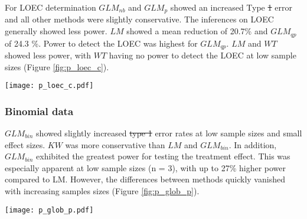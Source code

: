 \documentclass[twocolumn, natbib]{svjour3}
\providecommand{\DIFadd}[1]{{\protect\color{blue}\uwave{#1}}} %
\providecommand{\DIFdel}[1]{{\protect\color{red}\sout{#1}}}                      %
\providecommand{\DIFaddbegin}{} %
\providecommand{\DIFaddend}{} %
\providecommand{\DIFdelbegin}{} %
\providecommand{\DIFdelend}{} %
\providecommand{\DIFaddFL}[1]{\DIFadd{#1}} %
\providecommand{\DIFdelFL}[1]{\DIFdel{#1}} %
\providecommand{\DIFaddbeginFL}{} %
\providecommand{\DIFaddendFL}{} %
\providecommand{\DIFdelbeginFL}{} %
\providecommand{\DIFdelendFL}{} %
\begin{document}
For LOEC determination $GLM_{nb}$ and $GLM_{p}$ showed an increased Type \DIFdelbegin \DIFdel{1 }\DIFdelend \DIFaddbegin \DIFadd{I }\DIFaddend error and all other methods were slightly conservative.
The inferences on LOEC generally showed less power.
$LM$ showed a mean reduction of 20.7\% and $GLM_{qp}$ of 24.3 \%.
Power to detect the LOEC was highest for $GLM_{qp}$. 
$LM$ and $WT$ showed less power, with $WT$ having no power to detect the LOEC at low sample sizes (Figure \ref{fig:p_loec_c}).

\begin{figure*}
  \centering
  \texttt{[image: p\_loec\_c.pdf]}
  \caption{Count data simulations: Type \DIFdelbeginFL \DIFdelFL{1 }\DIFdelendFL \DIFaddbeginFL \DIFaddFL{I }\DIFaddendFL error (top) and Power (bottom) for determination of LOEC.
  For clarity only \DIFdelbeginFL \DIFdelFL{type 1 }\DIFdelendFL \DIFaddbeginFL \DIFaddFL{Type I }\DIFaddendFL errors \textless 25\% are displayed.
  Power levels for models with inflated \DIFdelbeginFL \DIFdelFL{type }\DIFdelendFL \DIFaddbeginFL \DIFaddFL{Type }\DIFaddendFL I error are shown for completeness.
  For n = \{3, 6\} and $\mu_C$ = \{2, 4\} less than 85\% of $GLM_{nb}$ models did converge.
  Dashed horizontal line denotes the nominal Type \DIFdelbeginFL \DIFdelFL{1 }\DIFdelendFL \DIFaddbeginFL \DIFaddFL{I }\DIFaddendFL error rate at $\alpha = 0.05$.
  }
  \label{fig:p_loec_c}
\end{figure*}


\subsubsection{Binomial data}

$GLM_{bin}$ showed slightly increased \DIFdelbegin \DIFdel{type 1 }\DIFdelend \DIFaddbegin \DIFadd{Type I }\DIFaddend error rates at low sample sizes and small effect sizes.
$KW$ was more conservative than $LM$ and $GLM_{bin}$.
In addition, $GLM_{bin}$ exhibited the greatest power for testing the treatment effect. 
This was especially apparent at low sample sizes (n = 3), with up to 27\% higher power compared to LM.
However, the differences between methods quickly vanished with increasing samples sizes (Figure \ref{fig:p_glob_p}).

\begin{figure*}
  \centering
  \texttt{[image: p\_glob\_p.pdf]}
  \caption{
  Binomial data simulations: 
  Type \DIFdelbeginFL \DIFdelFL{1 }\DIFdelendFL \DIFaddbeginFL \DIFaddFL{I }\DIFaddendFL error (top) and  power (bottom) for the test of a treatment effect. 
  Dashed horizontal line denotes the nominal Type \DIFdelbeginFL \DIFdelFL{1 }\DIFdelendFL \DIFaddbeginFL \DIFaddFL{I }\DIFaddendFL error rate at $\alpha = 0.05$.
  }
  \label{fig:p_glob_p}
\end{figure*}
\end{document}
